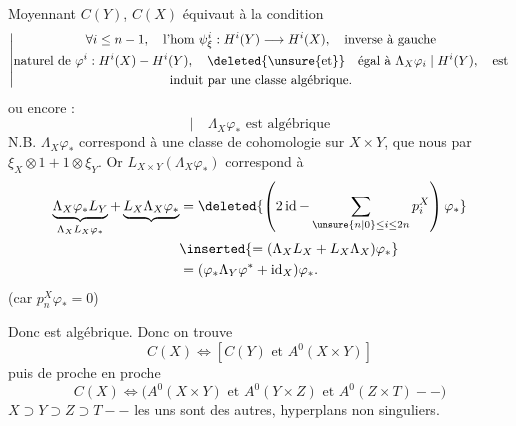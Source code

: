 Moyennant $C(Y)$, $C(X)$ équivaut à la condition
\[
\left|\begin{gathered}
\forall i\leq n-1,\quad\text{l'hom }\psi_\xi^i:H^i(Y)\longrightarrow H^i(X),\quad\text{inverse à gauche}\\
\text{naturel de }\varphi^i:H^i(X)\mathbin{-}H^i(Y),\quad\deleted{\text{\unsure{et}}}\quad\text{égal à }\Lambda_X\varphi_i\mid H^i(Y),\quad\text{est}\\
\text{induit par une classe algébrique.}
\end{gathered}\right.
\]
ou encore :
\[
\left|\quad\Lambda_X\varphi_*\text{ est algébrique}\right.
\]
\quad N.B. $\Lambda_X\varphi_*$ correspond à une classe de cohomologie
sur $X\times Y$, que nous  par $\xi_X\otimes1+1\otimes\xi_Y$.
Or  $L_{X\times Y}(\Lambda_X\varphi_*)$ correspond à
\[
\begin{aligned}
\underbrace{\Lambda_X\varphi_*L_Y}_{\Lambda_XL_X\varphi_*}
 +\underbrace{L_X\Lambda_X\varphi_*}
 &=\deleted{\left(2\operatorname{id}-\sum_{\unsure{n|0}\leq i\leq2n}p_i^X\right)\varphi_*}\\
 &\inserted{=(\Lambda_XL_X+L_X\Lambda_X)\varphi_*}\\
 &=(\varphi_*\Lambda_Y\varphi^*+\operatorname{id}_X)\varphi_*.
\end{aligned}
\]
(car $p_n^X\varphi_*=0$)

Donc est algébrique. Donc on trouve
\[
C(X)\Longleftrightarrow[C(Y)\text{ et }A^0(X\times Y)]
\]
puis de proche en proche
\[
C(X)\Longleftrightarrow\bigl(A^0(X\times Y)\text{ et }A^0(Y\times Z)\text{ et }A^0(Z\times T)\mathbin{-}\mathbin{-}\bigr)
\]
\quad
$X\supset Y\supset Z\supset T\mathbin{-}\mathbin{-}$ les uns sont  des autres, hyperplans non singuliers.

